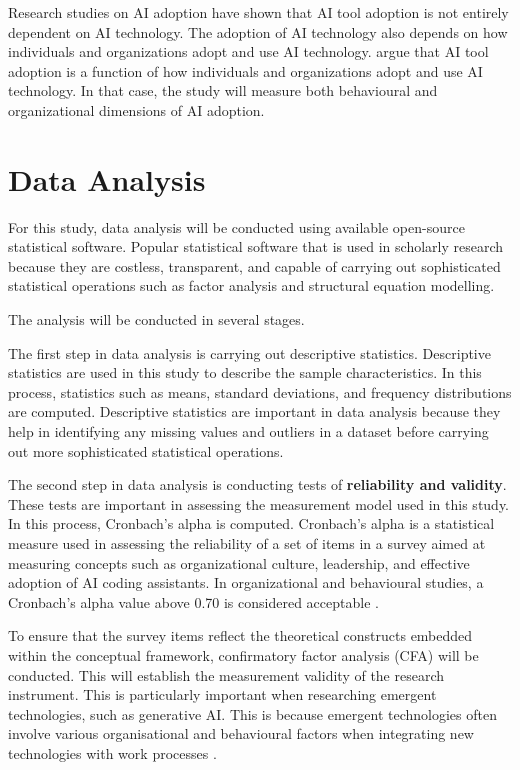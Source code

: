 Research studies on AI adoption have shown that AI tool adoption is not entirely dependent on AI technology. The adoption of AI technology also depends on how individuals and organizations adopt and use AI technology. \textcite{Brynjolfsson2025} argue that AI tool adoption is a function of how individuals and organizations adopt and use AI technology. In that case, the study will measure both behavioural and organizational dimensions of AI adoption.

\section{Data Analysis}
\label{sec:Data Analysis}
For this study, data analysis will be conducted using available open-source statistical software. Popular statistical software that is used in scholarly research because they are costless, transparent, and capable of carrying out sophisticated statistical operations such as factor analysis and structural equation modelling. 

The analysis will be conducted in several stages.

The first step in data analysis is carrying out descriptive statistics. Descriptive statistics are used in this study to describe the sample characteristics. In this process, statistics such as means, standard deviations, and frequency distributions are computed. Descriptive statistics are important in data analysis because they help in identifying any missing values and outliers in a dataset before carrying out more sophisticated statistical operations.

The second step in data analysis is conducting tests of \textbf{reliability and validity}. These tests are important in assessing the measurement model used in this study. In this process, Cronbach’s alpha is computed. Cronbach’s alpha is a statistical measure used in assessing the reliability of a set of items in a survey aimed at measuring concepts such as organizational culture, leadership, and effective adoption of AI coding assistants. In organizational and behavioural studies, a Cronbach’s alpha value above 0.70 is considered acceptable \autocite{Hair2019}.

To ensure that the survey items reflect the theoretical constructs embedded within the conceptual framework, confirmatory factor analysis (CFA) will be conducted. This will establish the measurement validity of the research instrument. This is particularly important when researching emergent technologies, such as generative AI. This is because emergent technologies often involve various organisational and behavioural factors when integrating new technologies with work processes \autocite{Mikalef2021}.

